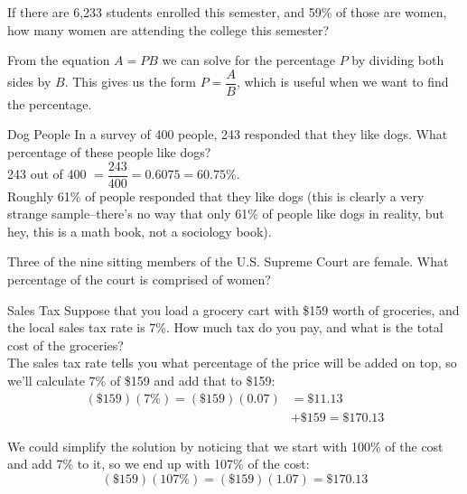 \begin{try}
If there are 6,233 students enrolled this semester, and 59\% of those are women, how many women are attending the college this semester?
\end{try}

From the equation $A=PB$ we can solve for the percentage $P$ by dividing both sides by $B$.  This gives us the form $P=\dfrac{A}{B}$, which is useful when we want to find the percentage.

\begin{example}[https://www.youtube.com/watch?v=C8SnqyhsVeo]{Dog People}
In a survey of 400 people, 243 responded that they like dogs.  What percentage of these people like dogs?\\

243 out of 400 $= \dfrac{243}{400} = 0.6075 = 60.75\%$.\\

Roughly 61\% of people responded that they like dogs (this is clearly a very strange sample--there's no way that only 61\% of people like dogs in reality, but hey, this is a math book, not a sociology book).
\end{example}

\begin{try}
Three of the nine sitting members of the U.S. Supreme Court are female.  What percentage of the court is comprised of women?
\end{try}

\begin{example}[https://www.youtube.com/watch?v=yCQCFHGGHms]{Sales Tax}
Suppose that you load a grocery cart with \$159 worth of groceries, and the local sales tax rate is 7\%. How much tax do you pay, and what is the total cost of the groceries?\\

The sales tax rate tells you what percentage of the price will be added on top, so we'll calculate 7\% of \$159 and add that to \$159:
\begin{align*}
(\$159)(7\%) = (\$159)(0.07) &= \$11.13\\
&+ \$159 = \$170.13
\end{align*}

We could simplify the solution by noticing that we start with 100\% of the cost and add 7\% to it, so we end up with 107\% of the cost: \[(\$159)(107\%) = (\$159)(1.07) = \$170.13\]
\end{example}
\vfill
\pagebreak

